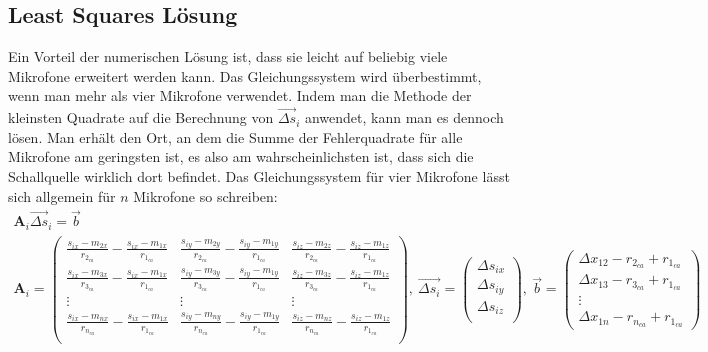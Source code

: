 \subsection{Least Squares Lösung}
Ein Vorteil der numerischen Lösung ist, dass sie leicht auf beliebig viele Mikrofone erweitert werden kann. Das Gleichungssystem wird überbestimmt, wenn man mehr als vier Mikrofone verwendet. Indem man die Methode der kleinsten Quadrate auf die Berechnung von $\vec{\Delta{s}}_i$ anwendet, kann man es dennoch lösen. Man erhält den Ort, an dem die Summe der Fehlerquadrate für alle Mikrofone am geringsten ist, es also am wahrscheinlichsten ist, dass sich die Schallquelle wirklich dort befindet.
Das Gleichungssystem für vier Mikrofone lässt sich allgemein für $n$ Mikrofone so schreiben:
\begin{gather*}
    \mathbf{A}_i\vec{\Delta{s}}_i = \vec{b}\\
    \mathbf{A}_i =
    {\begin{pmatrix}
          \frac{s_{ix} - m_{2x}}{r_{2_{ca}}} - \frac{s_{ix} - m_{1x}}{r_{1_{ca}}} & \frac{s_{iy} - m_{2y}}{r_{2_{ca}}} - \frac{s_{iy} - m_{1y}}{r_{1_{ca}}} & \frac{s_{iz} - m_{2z}}{r_{2_{ca}}} - \frac{s_{iz} - m_{1z}}{r_{1_{ca}}} \\
          \frac{s_{ix} - m_{3x}}{r_{3_{ca}}} - \frac{s_{ix} - m_{1x}}{r_{1_{ca}}} & \frac{s_{iy} - m_{3y}}{r_{3_{ca}}} - \frac{s_{iy} - m_{1y}}{r_{1_{ca}}} & \frac{s_{iz} - m_{3z}}{r_{3_{ca}}} - \frac{s_{iz} - m_{1z}}{r_{1_{ca}}} \\
          \vdots & \vdots & \vdots \\
          \frac{s_{ix} - m_{nx}}{r_{n_{ca}}} - \frac{s_{ix} - m_{1x}}{r_{1_{ca}}} & \frac{s_{iy} - m_{ny}}{r_{n_{ca}}} - \frac{s_{iy} - m_{1y}}{r_{1_{ca}}} & \frac{s_{iz} - m_{nz}}{r_{n_{ca}}} - \frac{s_{iz} - m_{1z}}{r_{1_{ca}}} \\
      \end{pmatrix}},
    ~
    \vec{\Delta{s}_i} =
    \begin{pmatrix}
        {\Delta{s}}_{ix} \\
        {\Delta{s}}_{iy} \\
        {\Delta{s}}_{iz} \\
    \end{pmatrix},
    ~
    \vec{b} =
    \begin{pmatrix}
        \Delta{x_{12}} - r_{2_{ca}} + r_{1_{ca}}\\
        \Delta{x_{13}} - r_{3_{ca}} + r_{1_{ca}}\\
        \vdots \\
        \Delta{x_{1n}} - r_{n_{ca}} + r_{1_{ca}}
    \end{pmatrix}
\end{gather*}

